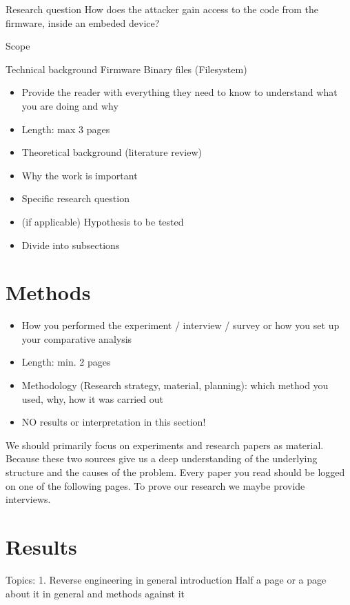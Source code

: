 \documentclass[]{report}
\begin{document}
Research question
How does the attacker gain access to the code from the firmware, inside an embeded device?

Scope

Technical background
Firmware
Binary files (Filesystem)

\begin{itemize}
	\item Provide the reader with everything they need to know to understand what you are doing and why

	\item Length: max 3 pages
	\item Theoretical background (literature review)
	\item Why the work is important
	\item Specific research question
	\item (if applicable) Hypothesis to be tested
	\item Divide into subsections
\end{itemize}



\section{Methods}
\begin{itemize}
	\item How you performed the experiment / interview / survey or how you set up your comparative analysis
	\item Length: min. 2 pages
	\item Methodology (Research strategy, material, planning): which method you used, why, how it was carried out
	\item NO results or interpretation in this section!
\end{itemize}

We should primarily focus on experiments and research papers as material. Because these two sources give us a deep understanding of the underlying structure and the causes of the problem. Every paper you read should be logged on one of the following pages. To prove our research we maybe provide interviews.

\section{Results}

Topics:
1. Reverse engineering in general introduction 
	Half a page or a page about it in general and methods against it
	
\end{document}
